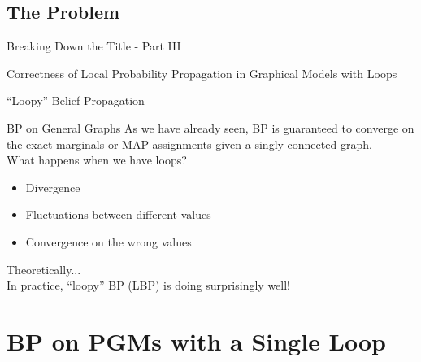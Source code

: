 \documentclass{beamer}
\begin{document}
\subsection{The Problem}
\begin{frame}{Breaking Down the Title - Part III}
    \begin{center}
        \Large{Correctness of \alert<1>{Local Probability Propagation} in Graphical Models with \alert<2>{Loops}}
    \end{center}
\end{frame}
\begin{frame}{``Loopy'' Belief Propagation}
    \begin{block}{BP on General Graphs}
        As we have already seen, BP is guaranteed to converge on the exact marginals or MAP assignments given a singly-connected graph.\\
        What happens when we have loops?
        \pause
        \begin{itemize}
            \item Divergence
            \item Fluctuations between different values
            \item Convergence on the wrong values
        \end{itemize}
        \pause
        Theoretically...\\
        \pause
        In practice, ``loopy'' BP (LBP) is doing surprisingly well!
    \end{block}
\end{frame}
\section{BP on PGMs with a Single Loop}
\end{document}
